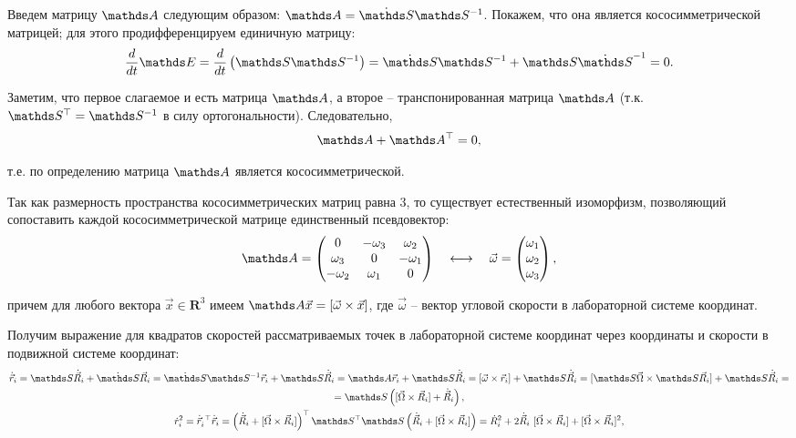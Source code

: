 Введем матрицу $\bbA$ следующим образом: $\bbA = \dot{\bbS} \bbS^{-1}$. Покажем, что она является кососимметрической матрицей; для этого продифференцируем единичную матрицу:
\vverh
\begin{gather}
\frac{d}{dt} \bbE = \frac{d}{dt} \left( \bbS \bbS^{-1}\right) = \dot{\bbS} \bbS^{-1} + \bbS \dot{\bbS}^{-1} = 0. \notag
\end{gather}

Заметим, что первое слагаемое и есть матрица $\bbA$, а второе -- транспонированная матрица $\bbA$ (т.к. $\bbS^\top = \bbS^{-1}$ в силу ортогональности). Следовательно,
\vverh
\begin{gather}
\bbA + \bbA^\top = 0, \notag
\end{gather}

\hspace*{-0.75cm} т.е. по определению матрица $\bbA$ является кососимметрической.

Так как размерность пространства кососимметрических матриц равна 3, то существует естественный изоморфизм, позволяющий сопоставить каждой кососимметрической матрице единственный псевдовектор:
\vverh
\begin{gather}
\bbA = 
\begin{pmatrix}
0 & -\omega_3 & \omega_2 \\
\omega_3 & 0 & -\omega_1 \\
-\omega_2 & \omega_1 & 0
\end{pmatrix}
\quad
\longleftrightarrow
\quad
\vec{\omega} = 
\begin{pmatrix}
\omega_1 \\
\omega_2 \\
\omega_3
\end{pmatrix}
,
\notag
\end{gather}

\hspace*{-0.75cm} причем для любого вектора $\vec{x} \in \mathbf{R}^3$ имеем $\bbA \vec{x} = [ \vec{\omega} \times \vec{x} ]$, где $\vec{\omega}$ -- вектор угловой скорости в лабораторной системе координат.

Получим выражение для квадратов скоростей рассматриваемых точек в лабораторной системе координат через координаты и скорости в подвижной системе координат:
\vverh
\begin{gather}
\dot{\vec{r}}_i = \bbS \dot{\vec{R}}_i + \dot{\bbS} \vec{R}_i = \dot{\bbS} \bbS^{-1} \vec{r}_i + \bbS \dot{\vec{R}}_i  = \bbA \vec{r}_i + \bbS \dot{\vec{R}}_i = [ \vec{\omega} \times \vec{r}_i ] + \bbS \dot{\vec{R}}_i = [\bbS \vec{\Omega} \times \bbS \vec{R}_i ] + \bbS \dot{\vec{R}}_i = \notag \\
= \bbS \left( [\vec{\Omega} \times \vec{R}_i ] + \dot{\vec{R}}_i \right)  \notag , \\
\dot{r}_i^2 = \dot{\vec{r}}_i^{\ \top} \dot{\vec{r}}_i = \left( \dot{\vec{R}}_i + [ \vec{\Omega} \times \vec{R}_i] \right)^\top \bbS^\top \bbS \left( \dot{\vec{R}}_i + [ \vec{\Omega} \times \vec{R}_i ] \right) = \dot{R}_i^2 + 2 \dot{\vec{R}}_i \ [ \vec{\Omega} \times \vec{R}_i] + [ \vec{\Omega} \times \vec{R}_i ]^2 \notag ,
\end{gather}

